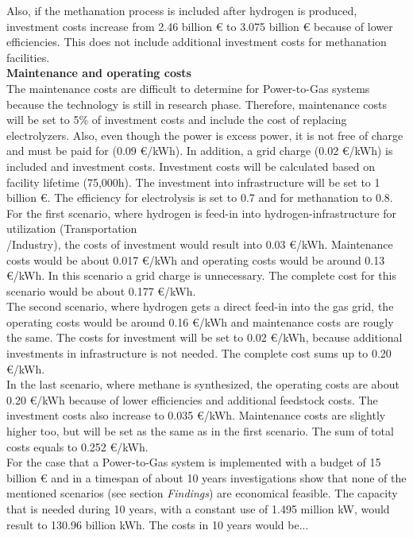 \begin{parcolumns}[colwidths={1=2.5 cm, 2=10 cm, 3=2.5 cm}]{3}
{Also, if the methanation process is included after hydrogen is produced, investment costs increase from 2.46 billion \euro{ } to 3.075 billion \euro{ } because of lower efficiencies. This does not include additional investment costs for methanation facilities.
\\
\textbf{Maintenance and operating costs}
\\
The maintenance costs are difficult to determine for Power-to-Gas systems because the technology is still in research phase. Therefore, maintenance costs will be set to 5\% of investment costs and include the cost of replacing electrolyzers. Also, even though the power is excess power, it is not free of charge and must be paid for (0.09 \euro /kWh). In addition, a grid charge (0.02 \euro /kWh) is included and investment costs. Investment costs will be calculated based on facility lifetime (75,000h). The investment into infrastructure will be set to 1 billion \euro . The efficiency for electrolysis is set to 0.7 and for methanation to 0.8.
\\
For the first scenario, where hydrogen is feed-in into hydrogen-infrastructure for utilization (Transportation\\/Industry), the costs of investment would result into 0.03 \euro /kWh. Maintenance costs would be about 0.017 \euro /kWh and operating costs would be around 0.13 \euro /kWh. In this scenario a grid charge is unnecessary. The complete cost for this scenario would be about 0.177 \euro /kWh.
\\
The second scenario, where hydrogen gets a direct feed-in into the gas grid, the operating costs would be around 0.16 \euro /kWh and maintenance costs are rougly the same. The costs for investment will be set to 0.02 \euro /kWh, because additional investments in infrastructure is not needed. The complete cost sums up to 0.20 \euro /kWh.
\\
In the last scenario, where methane is synthesized, the operating costs are about 0.20 \euro /kWh because of lower efficiencies and additional feedstock costs. The investment costs also increase to 0.035 \euro /kWh. Maintenance costs are slightly higher too, but will be set as the same as in the first scenario. The sum of total costs equals to 0.252 \euro /kWh.\\
For the case that a Power-to-Gas system is implemented with a budget of 15 billion \euro{ } and in a timespan of about 10 years investigations show that none of the mentioned scenarios (see section \textit{Findings}) are economical feasible. The capacity that is needed during 10 years, with a constant use of 1.495 million kW, would result to 130.96 billion kWh. The costs in 10 years would be... \\
}
\end{parcolumns}
